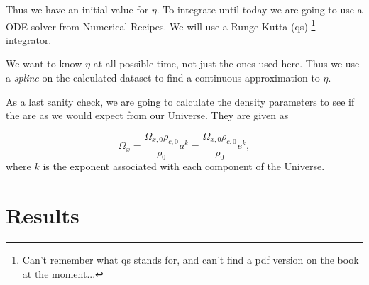 \documentclass[a4paper,norsk, 10pt]{article}
\begin{document}
Thus we have an initial value for $\eta$. To integrate until today we are going to use a ODE solver from Numerical Recipes. We will use a Runge Kutta (qs) \footnote{Can't remember what qs stands for, and can't find a pdf version on the book at the moment...} integrator. 

We want to know $\eta$ at all possible time, not just the ones used here. Thus we use a \textit{spline} on the calculated dataset to find a continuous approximation to $\eta$.


As a last sanity check, we are going to calculate the density parameters to see if the are as we would expect from our Universe. They are given as

\begin{equation}
\Omega_{x} = \frac{\Omega_{x,0}\rho_{c,0}}{\rho_{0}} a^{k} = \frac{\Omega_{x,0}\rho_{c,0}}{\rho_{0}} e^{k},
\end{equation}
where $k$ is the exponent associated with each component of the Universe.


\newpage

\section{Results}
\end{document}
